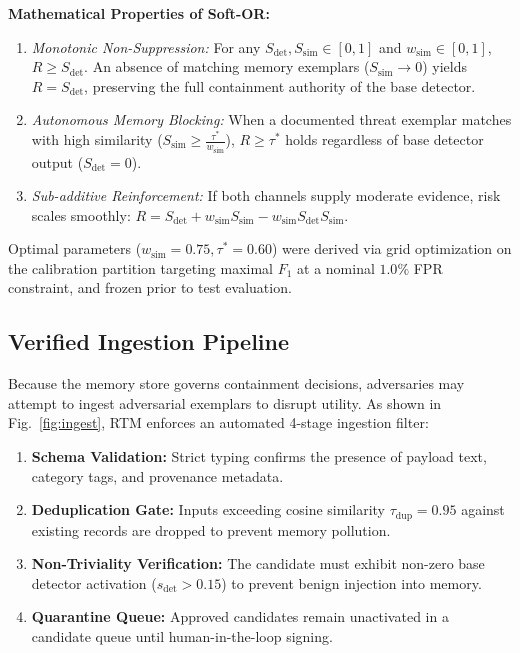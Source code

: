 \documentclass[conference]{IEEEtran}
\begin{document}
\noindent\textbf{Mathematical Properties of Soft-OR:}
\begin{enumerate}
    \item \textit{Monotonic Non-Suppression:} For any $S_{\text{det}}, S_{\text{sim}} \in [0, 1]$ and $w_{\text{sim}} \in [0, 1]$, $R \ge S_{\text{det}}$. An absence of matching memory exemplars ($S_{\text{sim}} \to 0$) yields $R = S_{\text{det}}$, preserving the full containment authority of the base detector.
    \item \textit{Autonomous Memory Blocking:} When a documented threat exemplar matches with high similarity ($S_{\text{sim}} \ge \frac{\tau^*}{w_{\text{sim}}}$), $R \ge \tau^*$ holds regardless of base detector output ($S_{\text{det}} = 0$).
    \item \textit{Sub-additive Reinforcement:} If both channels supply moderate evidence, risk scales smoothly: $R = S_{\text{det}} + w_{\text{sim}} S_{\text{sim}} - w_{\text{sim}} S_{\text{det}} S_{\text{sim}}$.
\end{enumerate}
Optimal parameters ($w_{\text{sim}} = 0.75, \tau^* = 0.60$) were derived via grid optimization on the calibration partition targeting maximal $F_1$ at a nominal $1.0\%$ FPR constraint, and frozen prior to test evaluation.

\subsection{Verified Ingestion Pipeline}
Because the memory store governs containment decisions, adversaries may attempt to ingest adversarial exemplars to disrupt utility. As shown in Fig.~\ref{fig:ingest}, RTM enforces an automated 4-stage ingestion filter:
\begin{enumerate}
    \item \textbf{Schema Validation:} Strict typing confirms the presence of payload text, category tags, and provenance metadata.
    \item \textbf{Deduplication Gate:} Inputs exceeding cosine similarity $\tau_{\text{dup}} = 0.95$ against existing records are dropped to prevent memory pollution.
    \item \textbf{Non-Triviality Verification:} The candidate must exhibit non-zero base detector activation ($s_{\text{det}} > 0.15$) to prevent benign injection into memory.
    \item \textbf{Quarantine Queue:} Approved candidates remain unactivated in a candidate queue until human-in-the-loop signing.
\end{enumerate}
\end{document}
